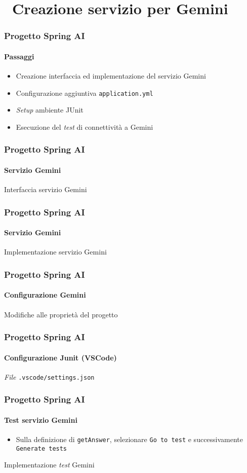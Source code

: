 \section{\faWrench\ Creazione servizio per Gemini} %
\label{sec:spring-ai-gemini-service}
%
\begin{frame}[t,fragile] \frametitle{Progetto Spring AI}
    \framesubtitle{Passaggi}
	\begin{itemize}
        \item[\alertedcircled{1}] Creazione interfaccia ed implementazione del servizio Gemini
        \item[\alertedcircled{2}] Configurazione aggiuntiva \texttt{application.yml}
        \item[\alertedcircled{3}] \textit{Setup} ambiente JUnit
        \item[\alertedcircled{4}] Esecuzione del \textit{test} di connettività a Gemini 
	\end{itemize}        
\end{frame}
%
\begin{frame}[t,fragile] \frametitle{Progetto Spring AI}
    \framesubtitle{Servizio Gemini}
        \begin{block}{Interfaccia servizio Gemini}
{\tiny}
    \end{block}
\end{frame}
%
\begin{frame}[t,fragile] \frametitle{Progetto Spring AI}
    \framesubtitle{Servizio Gemini}
        \begin{block}{Implementazione servizio Gemini}
{\tiny}
    \end{block}
\end{frame}
%
\begin{frame}[t,fragile] \frametitle{Progetto Spring AI}
    \framesubtitle{Configurazione Gemini}
        \begin{block}{Modifiche alle proprietà del progetto}
{\tiny}
    \end{block}
\end{frame}
%
\begin{frame}[t,fragile] \frametitle{Progetto Spring AI}
    \framesubtitle{Configurazione Junit (VSCode)}
        \begin{block}{\textit{File} \texttt{.vscode/settings.json}}
{\tiny}
    \end{block}
\end{frame}
%
\begin{frame}[t,fragile] \frametitle{Progetto Spring AI}
    \framesubtitle{Test servizio Gemini}
    \begin{itemize}
        \item[\alertedcircled{1}] Sulla definizione di \texttt{getAnswer}, selezionare \texttt{Go to test} e successivamente \texttt{Generate tests}
    \end{itemize}
        \begin{block}{Implementazione \textit{test} Gemini}
{\tiny}
    \end{block}
\end{frame}
